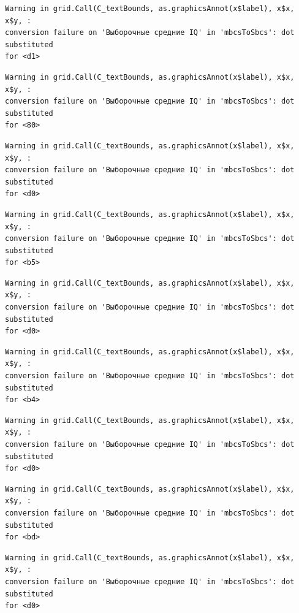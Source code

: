 \documentclass[
  letterpaper,
]{scrbook}
\theoremstyle{definition}
\theoremstyle{remark}
\begin{document}
\begin{verbatim}
Warning in grid.Call(C_textBounds, as.graphicsAnnot(x$label), x$x, x$y, :
conversion failure on 'Выборочные средние IQ' in 'mbcsToSbcs': dot substituted
for <d1>
\end{verbatim}

\begin{verbatim}
Warning in grid.Call(C_textBounds, as.graphicsAnnot(x$label), x$x, x$y, :
conversion failure on 'Выборочные средние IQ' in 'mbcsToSbcs': dot substituted
for <80>
\end{verbatim}

\begin{verbatim}
Warning in grid.Call(C_textBounds, as.graphicsAnnot(x$label), x$x, x$y, :
conversion failure on 'Выборочные средние IQ' in 'mbcsToSbcs': dot substituted
for <d0>
\end{verbatim}

\begin{verbatim}
Warning in grid.Call(C_textBounds, as.graphicsAnnot(x$label), x$x, x$y, :
conversion failure on 'Выборочные средние IQ' in 'mbcsToSbcs': dot substituted
for <b5>
\end{verbatim}

\begin{verbatim}
Warning in grid.Call(C_textBounds, as.graphicsAnnot(x$label), x$x, x$y, :
conversion failure on 'Выборочные средние IQ' in 'mbcsToSbcs': dot substituted
for <d0>
\end{verbatim}

\begin{verbatim}
Warning in grid.Call(C_textBounds, as.graphicsAnnot(x$label), x$x, x$y, :
conversion failure on 'Выборочные средние IQ' in 'mbcsToSbcs': dot substituted
for <b4>
\end{verbatim}

\begin{verbatim}
Warning in grid.Call(C_textBounds, as.graphicsAnnot(x$label), x$x, x$y, :
conversion failure on 'Выборочные средние IQ' in 'mbcsToSbcs': dot substituted
for <d0>
\end{verbatim}

\begin{verbatim}
Warning in grid.Call(C_textBounds, as.graphicsAnnot(x$label), x$x, x$y, :
conversion failure on 'Выборочные средние IQ' in 'mbcsToSbcs': dot substituted
for <bd>
\end{verbatim}

\begin{verbatim}
Warning in grid.Call(C_textBounds, as.graphicsAnnot(x$label), x$x, x$y, :
conversion failure on 'Выборочные средние IQ' in 'mbcsToSbcs': dot substituted
for <d0>
\end{verbatim}
\end{document}
